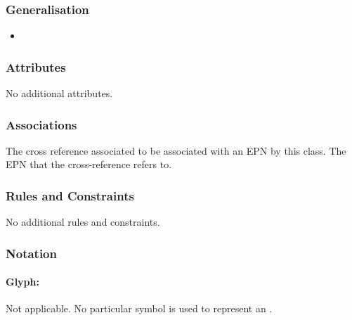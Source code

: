 \subsubsection{Generalisation}

\begin{itemize}
\item {}
\end{itemize}

\subsubsection{Attributes}

No additional attributes.

\subsubsection{Associations}

\begin{attributes}
 The cross reference
associated to be associated with an EPN by this class.
 The EPN that the
cross-reference refers to.
\end{attributes}

\subsubsection{Rules and Constraints}

No additional rules and constraints.

\subsubsection{Notation}

\paragraph{Glyph:  }\label{sec:equivalenceArc}

\begin{glyphDescription}
 \glyphSboTerm Not applicable.
 \glyphEndPoint No particular symbol is used to represent an .
 \end{glyphDescription}

